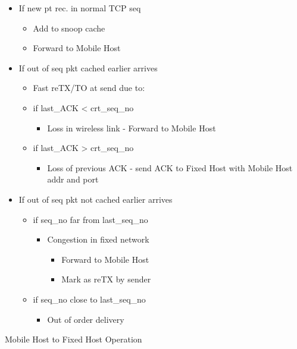 \documentclass[a4paper]{article}
\begin{document}
\begin{itemize}
	\item If new pt rec. in normal TCP seq
	\begin{itemize}
		\item Add to snoop cache
		\item Forward to Mobile Host
	\end{itemize}
	\item If out of seq pkt cached earlier arrives
	\begin{itemize}
		\item Fast reTX/TO at send due to:
		\item if last\_ACK < crt\_seq\_no
		\begin{itemize}
			\item Loss in wireless link - Forward to Mobile Host
		\end{itemize}
		\item if last\_ACK > crt\_seq\_no
		\begin{itemize}
			\item Loss of previous ACK - send ACK to Fixed Host with
				Mobile Host addr and port
		\end{itemize}
	\end{itemize}
	\item If out of seq pkt not cached earlier arrives
	\begin{itemize}
		\item if seq\_no far from last\_seq\_no
		\begin{itemize}
			\item Congestion in fixed network
			\begin{itemize}
				\item Forward to Mobile Host
				\item Mark as reTX by sender
			\end{itemize}
		\end{itemize}
		\item if seq\_no close to last\_seq\_no
		\begin{itemize}
			\item Out of order delivery
		\end{itemize}
	\end{itemize}
\end{itemize}
Mobile Host to Fixed Host Operation
\end{document}
